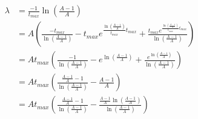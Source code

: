 \documentclass[12pt]{article}
\begin{document}
\begin{align*}
	\lambda &= \frac{-1}{t_{max}} \ln\left(\frac{A - 1}{A}\right) \\
			&= A \left(\frac{-t_{max}}{\ln\left(\frac{A-1}{A}\right)} - t_{max} e^{\frac{\ln\left(\frac{A-1}{A}\right)}{t_{max}} t_{max}} + \frac{t_{max} e^{\frac{\ln\left(\frac{A-1}{A}\right)}{t_{max}} t_{max}}}{\ln\left(\frac{A-1}{A}\right)}\right) \\
			&= A t_{max} \left(\frac{-1}{\ln\left(\frac{A-1}{A}\right)} - e^{\ln\left(\frac{A-1}{A}\right)} + \frac{e^{\ln\left(\frac{A-1}{A}\right)}}{\ln\left(\frac{A-1}{A}\right)}\right) \\
			&= A t_{max} \left( \frac{\frac{A-1}{A} - 1}{\ln\left(\frac{A-1}{A}\right)} - \frac{A-1}{A} \right) \\
			&= A t_{max} \left( \frac{\frac{A-1}{A} - 1}{\ln\left(\frac{A-1}{A}\right)} - \frac{\frac{A-1}{A} \ln\left(\frac{A-1}{A}\right)}{\ln\left(\frac{A-1}{A}\right)} \right) \\
\end{align*}
\end{document}
